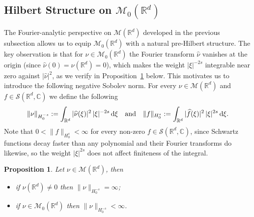 \documentclass[12pt,a4paper,oneside]{amsart}
\theoremstyle{plain}
\newtheorem{proposition}[theorem]{Proposition}
\theoremstyle{definition}
\numberwithin{equation}{section}
\numberwithin{figure}{section}
\numberwithin{table}{section}
\theoremstyle{remark}
\newcommand{\R}{\mathbb{R}}
\newcommand{\dd}{\textup{d}}
\newcommand{\calM}{\mathcal{M}}
\newcommand{\Fhat}[1]{\widehat{#1}}
\begin{document}
\subsection{Hilbert Structure on \texorpdfstring{$\calM_0(\R^d)$}{M\_0(R\^{}d)}}\label{sec:Hilbert}
% 
The Fourier-analytic perspective on $\calM(\R^d)$ developed in the 
previous subsection allows us to equip $\calM_0(\mathbb{R}^d)$ with a natural 
pre-Hilbert structure. The key observation is that for $\nu \in \calM_0(\R^d)$ 
the Fourier transform $\Fhat{\nu}$ vanishes at the origin (since 
$\Fhat{\nu}(0) = \nu(\R^d) = 0$), which makes the weight $|\xi|^{-2s}$ 
integrable near zero against $|\Fhat{\nu}|^2$, as we verify in 
Proposition~\ref{p:finitezza norma} below. This motivates us to introduce the following negative Sobolev norm.
For every $\nu\in \calM(\R^d)$ and $f\in \mathcal{S}(\R^d,\mathbb{C})$ 
we define the following
\begin{equation}\label{e:norma sobolev negativa}
    \|\nu\|_{H_0^{-s}}:=\int_{\R^d}|\Fhat{\nu}(\xi)|^2\,|\xi|^{-2s}\,\dd \xi \quad \textup{and} \quad  \|f\|_{H_0^{s}}:=\int_{\R^d}|\Fhat{f}(\xi)|^2\,|\xi|^{2s}\,\dd \xi.
\end{equation}
Note that $0 < \|f\|_{H_0^{s}} < \infty$ for every non-zero 
$f \in \mathcal{S}(\R^d,\mathbb{C})$, since Schwartz functions decay 
faster than any polynomial and their Fourier transforms do likewise, 
so the weight $|\xi|^{2s}$ does not affect finiteness of the integral.
\begin{proposition}\label{p:finitezza norma}
Let $\nu\in\calM(\R^d)$, then 
\begin{itemize}
    \item[1.] if $\nu(\R^d)\neq 0$ then $\|\nu\|_{H_0^{-s}}=\infty$;
    \item[2.] if $\nu\in \calM_0(\R^d)$ then $\|\nu\|_{H_0^{-s}}<\infty$.
\end{itemize}
\end{proposition}
\end{document}
